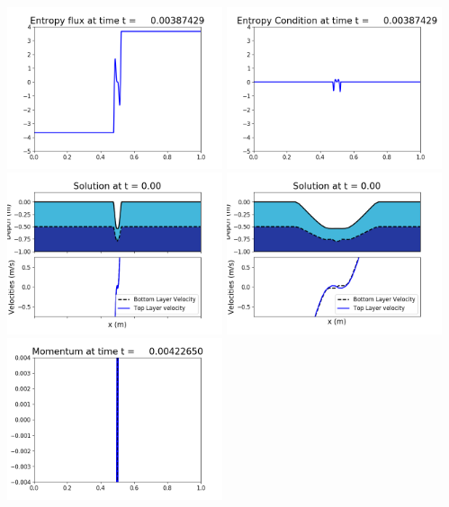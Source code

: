 \documentclass[11pt]{article}
\begin{document}
\includegraphics[width=0.475\textwidth]{frame0012fig1008.png}
\vskip 10pt 
\includegraphics[width=0.475\textwidth]{frame0012fig1009.png}
\vskip 10pt 
\includegraphics[width=0.475\textwidth]{frame0013fig1001.png}
\includegraphics[width=0.475\textwidth]{frame0013fig1002.png}
\vskip 10pt 
\includegraphics[width=0.475\textwidth]{frame0013fig1003.png}
\end{document}
